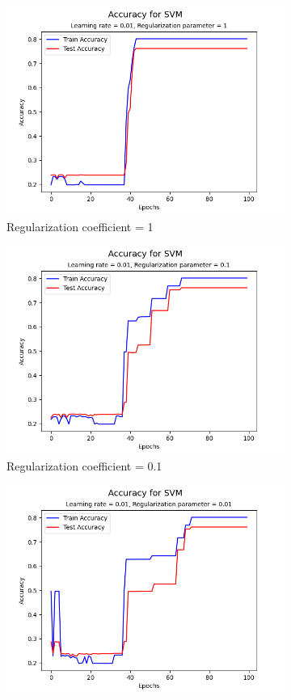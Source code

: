 \documentclass[a4paper, utf8]{ctexart}
\begin{document}
	\begin{figure}[htbp]
		\centering
		\begin{subfigure}{.45\textwidth}
			\centering
			\includegraphics[width=.9\textwidth]{./figure/myplotS2.png}
			\caption{Regularization coefficient = 1}
		\end{subfigure}
		\begin{subfigure}{.45\textwidth}
			\centering
			\includegraphics[width=.9\textwidth]{./figure/myplotS3.png}
			\caption{Regularization coefficient = 0.1}
		\end{subfigure}
		\begin{subfigure}{.45\textwidth}
			\centering
			\includegraphics[width=.9\textwidth]{./figure/myplotS4.png}

\end{subfigure}
\end{figure}
\end{document}
